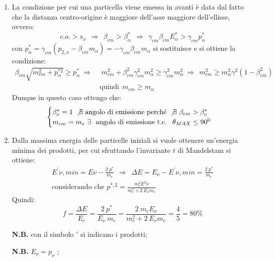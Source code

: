 \documentclass[12pt,twoside,a4]{article}
\begin{document}
\begin{solution}
\vspace{-1cm}
\begin{enumerate}[label=(\textit{\roman*})]
\item La condizione per cui una particella viene emessa in avanti è data dal fatto che la distanza centro-origine è maggiore dell'asse maggiore dell'ellisse, ovvero:
\begin{equation*}
c.o. > s_x \ \ \Rightarrow \ \ \beta_{cm} > \beta^\ast_\alpha \ \ \Rightarrow \ \ \gamma_{cm} \beta_{cm} E^\ast_\alpha > \gamma_{cm} p^\ast_\alpha 
\end{equation*}
con $p^\ast_\alpha = \gamma_{cm} (p_{2,x} - \beta_{cm} m_\alpha) = -\gamma_{cm} \beta_{cm} m_\alpha$ si sostituisce e si ottiene la condizione:
\begin{align*}
\beta_{cm} \sqrt{m^2_{cm} + p^{\ast 2}_\alpha} \ge p^\ast_\alpha \ \Rightarrow \ & \ m^2_{cm} + \beta^2_{cm} \gamma^2_{cm} m^2_\alpha \ge \gamma^2_{cm} m^2_\alpha \ \Rightarrow \ \ m^2_{cm} \ge m^2_\alpha \gamma^2 (1-\beta^2_{cm})  \\
 &\text{quindi} \ \ m_{cm} \ge m_\alpha 
\end{align*}
Dunque in questo caso ottengo che:
\begin{equation*}
\begin{cases}
\beta^\ast_\nu =1 \  \not\exists \text{ angolo di emissione perché} \ \not\exists \ \beta_{cm} > \beta^\ast_\nu \\
m_{cm} = m_e \  \exists \ \text{ angolo di emissione t.c. } \ \theta_{MAX} \le 90^0
\end{cases} 
\end{equation*}
\item Dalla massima energia delle particelle iniziali si vuole ottenere un'energia minima dei prodotti, per cui sfruttando l'invariante $t$ di Mandelstam si ottiene:
\begin{gather*}
E^{'}{ \nu, min} = E\nu - \frac{2 \ p^\ast}{m_e} \ \ \Rightarrow \ \ \Delta E = E_\nu - E^{'}{ \nu, min} = \frac{2 \ p^\ast}{m_e} \\
\text{considerando che } p^{\ast,2} = \frac{m^2_e E^2\nu}{m^2_e + 2 \ E_\nu m_e} 
\end{gather*}
Quindi:
\begin{equation*}
f = \frac{\Delta E}{E_e} = \frac{2 \ p^\ast}{E_\nu \ m_e} = \frac{2 \ m_e E_\nu}{m^2_e+2 \ E_\nu m_e} = \frac{4}{5} = 80 \%
\end{equation*}
 
 \bigskip
 \textbf{N.B.} con il simbolo $'$ si indicano i prodotti;
 
 \textbf{N.B.} $E_\nu = p_\nu$ ; 
 \end{enumerate}
\end{solution}
\end{document}
